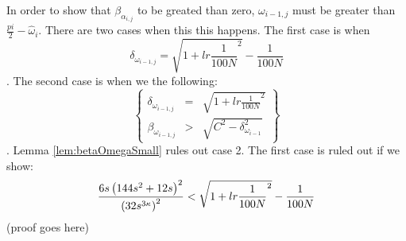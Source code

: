 In order to show that $\beta_{\alpha_{i,j}}$ to be greated than zero, $\omega_{i-1,j}$ must be greater than $\frac{pi}{2} - \hat{\omega}_i$.  
There are two cases when this this happens.  
The first case is when $$\delta_{\omega_{i-1,j}} = \sqrt{1 + lr{\frac{1}{100N}}^2} - \frac{1}{100N}$$.  
The second case is when we the following:
$$\left\lbrace\begin{array}{rcl}
\delta_{\omega_{i-1,j}} &=& \sqrt{1 + lr{\frac{1}{100N}}^2}\\
\beta_{\omega_{i-1,j}} &>& \sqrt{C^2 - \delta_{\omega_{i-1}}^2}
\end{array}\right\rbrace				
$$.  
Lemma \ref{lem:betaOmegaSmall} rules out case 2.  
The first case is ruled out if we show:
$$\frac{6s\left( 144s^2+12s \right)^2}{\left( 32s^{3\kappa} \right)^2} < \sqrt{1 + lr{\frac{1}{100N}}^2} - \frac{1}{100N}$$
(proof goes here) 